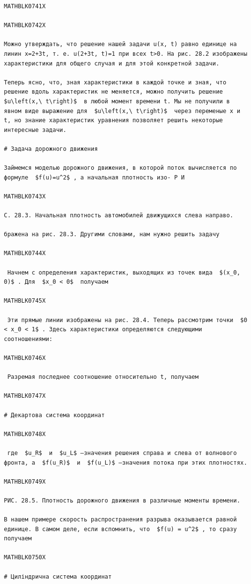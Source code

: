 \documentclass[
]{article}
\begin{document}
\begin{verbatim}
MATHBLK0741X

MATHBLK0742X

Можно утверждать, что решение нашей задачи u(x, t) равно единице на линин x=2+3t, т. е. u(2+3t, t)=1 при всех t>0. На рис. 28.2 изображены характеристики для общего случая и для этой конкретной задачи.

Теперь ясно, что, зная характеристики в каждой точке и зная, что решение вдоль характеристик не меняется, можно получить решение  $u\left(x,\ t\right)$  в любой момент времени t. Мы не получили в явном виде выражение для  $u\left(x,\ t\right)$  через переменые x и t, но знание характеристик уравнения позволяет решить некоторые интересные задачи.

# Задача дорожного движения

Займемся моделью дорожного движения, в которой поток вычисляется по формуле  $f(u)=u^2$ , а начальная плотность изо- Р И

MATHBLK0743X

С. 28.3. Начальная плотность автомобилей движущихся слева направо.

бражена на рис. 28.3. Другими словами, нам нужно решить задачу

MATHBLK0744X

 Начнем с определения характеристик, выходящих из точек вида  $(x_0, 0)$ . Для  $x_0 < 0$  получаем

MATHBLK0745X

 Эти прямые линии изображены на рис. 28.4. Теперь рассмотрим точки  $0 < x_0 < 1$ . Здесь характеристики определяются следующими соотношениями:

MATHBLK0746X

 Разремая последнее соотношение относительно t, получаем

MATHBLK0747X

# Декартова система координат

MATHBLK0748X

 где  $u_R$  и  $u_L$ —значения решения справа и слева от волнового фронта, а  $f(u_R)$  и  $f(u_L)$ —значения потока при этих плотностях.

MATHBLK0749X

РИС. 28.5. Плотность дорожного движения в различные моменты времени.

В нашем примере скорость распространения разрыва оказывается равной единице. В самом деле, если вспомнить, что  $f(u) = u^2$ , то сразу получаем

MATHBLK0750X

# Циліндрична система координат


\end{verbatim}
\end{document}
